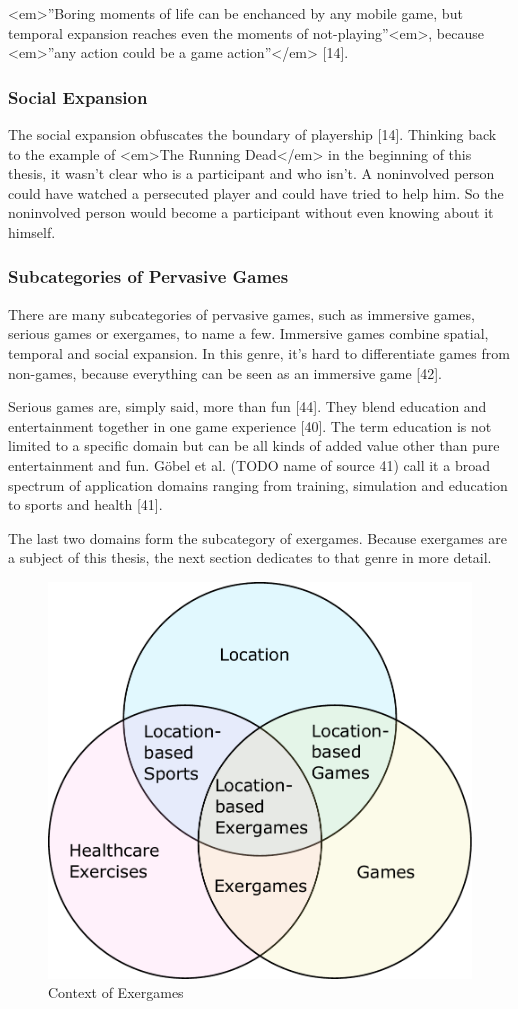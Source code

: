 <em>”Boring moments of life can be enchanced by any mobile game, but temporal expansion reaches even the moments of not-playing”<em>, because <em>”any action could be a game action”</em> [14].

\subsubsection{Social Expansion}
The social expansion obfuscates the boundary of playership [14]. Thinking back to the example of <em>The Running Dead</em> in the beginning of this thesis, it wasn’t clear who is a participant and who isn’t. A noninvolved person could have watched a persecuted player and could have tried to help him. So the noninvolved person would become a participant without even knowing about it himself.

\subsubsection{Subcategories of Pervasive Games}
There are many subcategories of pervasive games, such as immersive games, serious games or exergames, to name a few. Immersive games combine spatial, temporal and social expansion. In this genre, it’s hard to differentiate games from non-games, because everything can be seen as an immersive game [42].

Serious games are, simply said, more than fun [44]. They blend education and entertainment together in one game experience [40]. The term education is not limited to a specific domain but can be all kinds of added value other than pure entertainment and fun. Göbel et al. (TODO name of source 41) call it a broad spectrum of application domains ranging from training, simulation and education to sports and health [41].

The last two domains form the subcategory of exergames. Because exergames are a subject of this thesis, the next section dedicates to that genre in more detail.

\begin{figure}[bth]
  \centering
        \includegraphics[width=.55\linewidth]{gfx/exergame_context}
        \caption{Context of Exergames}
        \label{fig:exergameContext}
\end{figure}

